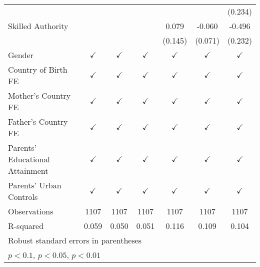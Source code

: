 \documentclass[]{article}
\begin{document}
\begin{table}
\begin{adjustbox}{width=\columnwidth,center}
{\begin{tabular}{l*{6}{c}}
                &                  &                  &                  &                  &                  &  (0.234)         \\
[1em]
Skilled Authority&                  &                  &                  &    0.079         &   -0.060         &   -0.496\sym{**} \\
                &                  &                  &                  &  (0.145)         &  (0.071)         &  (0.232)         \\
\hline
Gender          &$\checkmark$         &$\checkmark$         &$\checkmark$         &$\checkmark$         &$\checkmark$         &$\checkmark$         \\
Country of Birth FE&$\checkmark$         &$\checkmark$         &$\checkmark$         &$\checkmark$         &$\checkmark$         &$\checkmark$         \\
Mother's Country FE&$\checkmark$         &$\checkmark$         &$\checkmark$         &$\checkmark$         &$\checkmark$         &$\checkmark$         \\
Father's Country FE&$\checkmark$         &$\checkmark$         &$\checkmark$         &$\checkmark$         &$\checkmark$         &$\checkmark$         \\
Parents' Educational Attainment&$\checkmark$         &$\checkmark$         &$\checkmark$         &$\checkmark$         &$\checkmark$         &$\checkmark$         \\
Parents' Urban Controls&$\checkmark$         &$\checkmark$         &$\checkmark$         &$\checkmark$         &$\checkmark$         &$\checkmark$         \\
Observations    & 1107 & 1107 & 1107   & 1107  & 1107        & 1107\\
R-squared       &    0.059         &    0.050         &    0.051         &    0.116         &    0.109         &    0.104         \\
\hline\hline
\multicolumn{7}{l}{\footnotesize Robust standard errors in parentheses}\\
\multicolumn{7}{l}{\footnotesize \sym{*} \(p<0.1\), \sym{**} \(p<0.05\), \sym{***} \(p<0.01\)}\\
\end{tabular}
}





\end{adjustbox}

\end{table}
\end{document}
